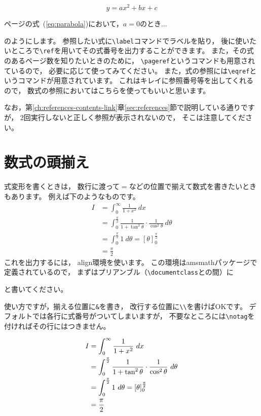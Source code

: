 \begin{IOTeX}
\begin{equation}
y = ax^2 + bx + c \label{eq:parabola}
\end{equation}

\pageref{eq:parabola}ページの式~(\ref{eq:parabola})において，$a=0$のとき...
\end{IOTeX}

のようにします。
参照したい式に\verb|\label|コマンドでラベルを貼り，
後に使いたいところで\verb|\ref|を用いてその式番号を出力することができます。
また，その式のあるページ数を知りたいときのために，
\verb|\pageref|というコマンドも用意されているので，
必要に応じて使ってみてください。
また，式の参照には\verb|\eqref|というコマンドが用意されています。
これはキレイに参照番号等を出してくれるので，
数式の参照においてはこちらを使ってもいいと思います。

なお，第\ref{ch:references-contents-link}章\ref{sec:references}節で説明している通りですが，
2回実行しないと正しく参照が表示されないので，
そこは注意してください。




\section{数式の頭揃え}
\label{sec:align}

式変形を書くときは，
数行に渡って$=$などの位置で揃えて数式を書きたいときもあります。
例えば下のようなものです。
\begin{align*}
I & = \int_0^{\infty} \frac{1}{1 + x^2} \ dx \\
	& = \int_0^{\frac{\pi}{2}} \frac{1}{1 + \tan^2 \theta} \cdot \frac{1}{\cos^2 \theta} \ d\theta \\
	& = \int_0^{\frac{\pi}{2}} 1 \ d\theta = \left[ \theta \right]_0^{\frac{\pi}{2}} \\
	& = \frac{\pi}{2}
\end{align*}
これを出力するには，
align環境を使います。
この環境はamsmathパッケージで定義されているので，
まずはプリアンブル（\verb|\documentclass|と\verb||の間）に
\begin{ITeX}
\usepackage{amsmath}
\end{ITeX}
と書いてください。

使い方ですが，揃える位置に\verb|&|を書き，
改行する位置に\verb|\\|を書けばOKです。
デフォルトでは各行に式番号がついてしまいますが，
不要なところには\verb|\notag|を付ければその行にはつきません。

\begin{IOTeX*}
\begin{align}
I & = \int_0^{\infty} \frac{1}{1 + x^2} \ dx \\
  & = \int_0^{\frac{\pi}{2}} \frac{1}{1 + \tan^2 \theta} \cdot \frac{1}{\cos^2 \theta} \ d\theta \\
  & = \int_0^{\frac{\pi}{2}} 1 \ d\theta = \left[ \theta \right]_0^{\frac{\pi}{2}} \notag \\
  & = \frac{\pi}{2}
\end{align}
\end{IOTeX*}

